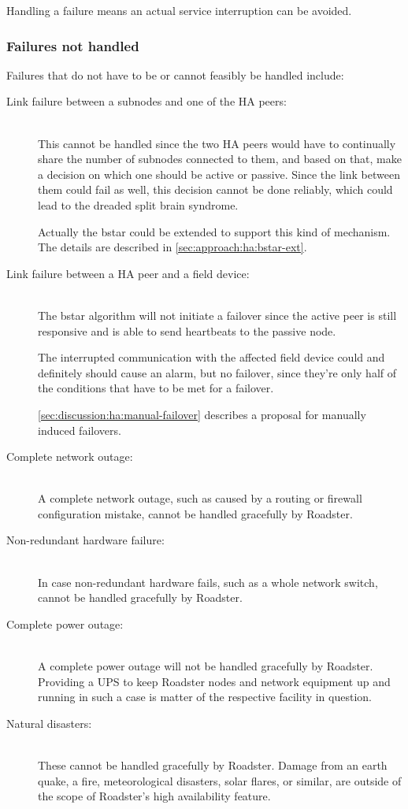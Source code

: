 Handling a failure means an actual service interruption can be avoided.

\subsubsection{Failures not handled}
Failures that do not have to be or cannot feasibly be handled include:

\begin{description}
	\item [Link failure between a subnodes and one of the HA peers:]\hfill\\

		This cannot be handled since the two HA peers would have to
		continually share the number of subnodes connected to them, and
		based on that, make a decision on which one should be active or
		passive. Since the link between them could fail as well, this
		decision cannot be done reliably, which could lead to the
		dreaded split brain syndrome.

		Actually the \gls{bstar} could be extended to support this kind
		of mechanism. The details are described in
		\autoref{sec:approach:ha:bstar-ext}.


	\item [Link failure between a HA peer and a field device:]\hfill\\
		The \gls{bstar} algorithm will not initiate a failover since the
		active peer is still responsive and is able to send heartbeats to the passive node.

		The interrupted communication with the affected field device
		could and definitely should cause an alarm, but no failover,
		since they're only half of the conditions that have to be met
		for a failover.

		\autoref{sec:discussion:ha:manual-failover} describes a
		proposal for manually induced failovers.

	\item [ Complete network outage:]\hfill\\
		A complete network outage, such as caused by a routing or
		firewall configuration mistake, cannot be handled gracefully by
		Roadster.

	\item [ Non-redundant hardware failure:]\hfill\\
		In case non-redundant hardware fails, such as a whole network
		switch, cannot be handled gracefully by Roadster.

	\item [ Complete power outage:]\hfill\\
		A complete power outage will not be handled gracefully by
		Roadster. Providing a \gls{UPS} to keep Roadster nodes and
		network equipment up and running in such a case is matter of
		the respective facility in question.

	\item [ Natural disasters:]\hfill\\
		These cannot be handled gracefully by Roadster. Damage from an
		earth quake, a fire, meteorological disasters, solar flares, or
		similar, are outside of the scope of Roadster's high
		availability feature.
\end{description}

